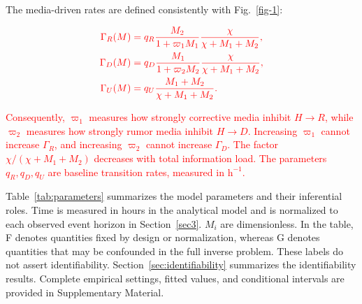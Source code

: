 \documentclass[letterpaper,journal]{IEEEtran}
\begin{document}
	The media-driven rates are defined consistently with Fig.~\ref{fig-1}:
	
	\begin{equation}
		\textcolor{red}{
		\label{sys:functions}
		\begin{aligned}
		\Gamma_R(M)&=q_R\frac{M_2}{1+\varpi_1M_1}\frac{\chi}{\chi+M_1+M_2},\\
		\Gamma_D(M)&=q_D\frac{M_1}{1+\varpi_2M_2}\frac{\chi}{\chi+M_1+M_2},\\
		\Gamma_U(M)&=q_U\frac{M_1+M_2}{\chi+M_1+M_2}.
		\end{aligned}}
	\end{equation}
	
	\textcolor{red}{Consequently, $\varpi_1$ measures how strongly corrective media inhibit $H\to R$, while $\varpi_2$ measures how strongly rumor media inhibit $H\to D$. Increasing $\varpi_1$ cannot increase $\Gamma_R$, and increasing $\varpi_2$ cannot increase $\Gamma_D$. The factor $\chi/(\chi+M_1+M_2)$ decreases with total information load. The parameters \(q_R,q_D,q_U\) are baseline transition rates, measured in \(\mathrm{h}^{-1}\). }

	Table~\ref{tab:parameters} summarizes the model parameters and their inferential roles. Time is measured in hours in the analytical model and is normalized to each observed event horizon in Section~\ref{sec3}. $M_i$ are dimensionless. In the table, F denotes quantities fixed by design or normalization, whereas G denotes quantities that may be confounded in the full inverse problem. These labels do not assert identifiability. Section~\ref{sec:identifiability} summarizes the identifiability results. Complete empirical settings, fitted values, and conditional intervals are provided in Supplementary Material.
\end{document}
